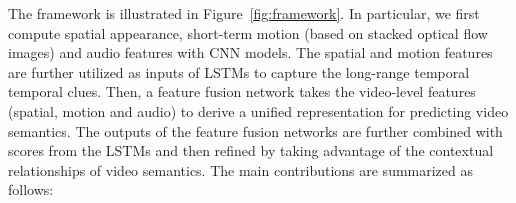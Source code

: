 \documentclass[journal]{IEEEtran}
\begin{document}

The framework is illustrated in Figure~\ref{fig:framework}. In particular, we first compute spatial appearance, short-term motion (based on stacked optical flow images) and audio features with CNN models. The spatial and motion features are further utilized as inputs of LSTMs to capture the long-range temporal temporal clues. Then, a feature fusion network takes the video-level features (spatial, motion and audio) to derive a unified representation for predicting video semantics. The outputs of the feature fusion networks are further combined with scores from the LSTMs and then refined by taking advantage of the contextual relationships of video semantics. The main contributions are summarized as follows:
\end{document}
